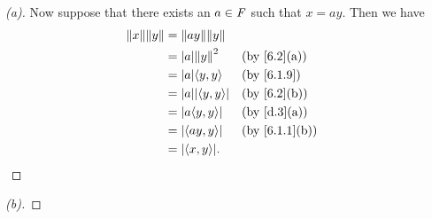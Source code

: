 \begin{proof}[(a)]
  Now suppose that there exists an \(a \in \mathit{F}\) such that \(x = ay\).
  Then we have
  \begin{align*}
    \norm{x} \norm{y} & = \norm{ay} \norm{y}                                        \\
                      & = \abs{a} \norm{y}^2       &  & \text{(by \cref{6.2}(a))}   \\
                      & = \abs{a} \inn{y, y}       &  & \text{(by \cref{6.1.9})}    \\
                      & = \abs{a} \abs{\inn{y, y}} &  & \text{(by \cref{6.2}(b))}   \\
                      & = \abs{a \inn{y, y}}       &  & \text{(by \cref{d.3}(a))}   \\
                      & = \abs{\inn{ay, y}}        &  & \text{(by \cref{6.1.1}(b))} \\
                      & = \abs{\inn{x, y}}.
  \end{align*}
\end{proof}

\begin{proof}[(b)]

\end{proof}
